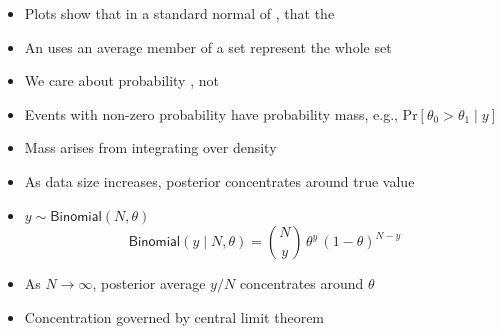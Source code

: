 \documentclass[10pt]{report}
\begin{document}
%
\begin{itemize}
\item Plots show that in a standard normal of ,
  that the 
\item An  uses an average member of a set
  represent the whole set
\end{itemize}




%
\begin{itemize}
\item We care about probability , not 
\item Events with non-zero probability have probability mass, e.g.,
  $\mbox{Pr}[\theta_0 > \theta_1 \mid y]$
\item Mass arises from integrating over density
\item As data size increases, posterior concentrates around true value
\end{itemize}

%
\begin{itemize}
\item $y \sim \mathsf{Binomial}(N, \theta)$
\[
\mathsf{Binomial}(y \mid N, \theta)
= \binom{N}{y} \, \theta^y \, (1 - \theta)^{N - y}
\]
\item As $N \rightarrow \infty$, posterior average $y / N$
  concentrates around $\theta$
\item Concentration governed by central limit theorem
\end{itemize}
\end{document}
